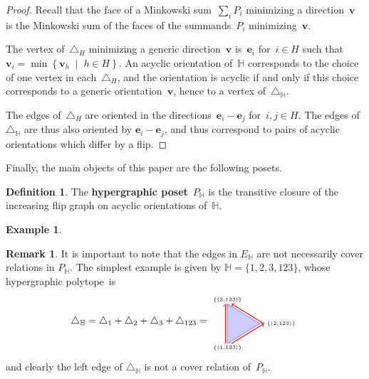 \documentclass[reqno]{amsart}
\theoremstyle{definition}
\newtheorem{definition}[theorem]{Definition}
\newtheorem{example}[theorem]{Example}
\newtheorem{remark}[theorem]{Remark}
\renewcommand{\b}[1]{\boldsymbol{#1}} %
\newcommand{\set}[2]{\left\{ #1 \;\middle|\; #2 \right\}} %
\newcommand{\simplex}{\triangle} %
\newcommand{\defn}[1]{\textbf{\textsf{\color{PineGreen} #1}}} %
\newcommand{\vincent}[1]{\todo[size=\tiny,color=blue!30]{ #1 \\ \hfill --- V.}\,}
\newcommand{\HH}{\mathbb H}  %
\begin{document}
\begin{proof}
Recall that the face of a Minkowski sum~$\sum_i P_i$ minimizing a direction~$\b{v}$ is the Minkowski sum of the faces of the summands~$P_i$ minimizing~$\b{v}$.

The vertex of~$\simplex_H$ minimizing a generic direction~$\b{v}$ is~$\b{e}_i$ for~$i \in H$ such that~$\b{v}_i = \min\set{\b{v}_h}{h \in H}$.
An acyclic orientation of~$\HH$ corresponds to the choice of one vertex in each~$\simplex_H$, and the orientation is acyclic if and only if this choice corresponds to a generic orientation~$\b{v}$, hence to a vertex of~$\simplex_\HH$.

The edges of~$\simplex_H$ are oriented in the directions~$\b{e}_i-\b{e}_j$ for~$i,j \in H$.
The edges of~$\simplex_\HH$ are thus also oriented by $\b{e}_i-\b{e}_j$, and thus correspond to pairs of acyclic orientations which differ by a flip.
\end{proof}

Finally, the main objects of this paper are the following posets.

\begin{definition}
The \defn{hypergraphic poset}~$P_\HH$ is the transitive closure of the increasing flip graph on acyclic orientations of~$\HH$.
\end{definition}

\begin{example}
\vincent{todo}
\end{example}

\begin{remark}
\label{rem:edgeNotCover}
It is important to note that the edges in $E_\HH$ are not necessarily cover relations in $P_\HH$.
The simplest example is given by
$\HH=\{ 1, 2, 3, 123 \}$, 
whose hypergraphic polytope~is
\[
	\simplex_\HH=\simplex_1+\simplex_2+\simplex_3+\simplex_{123}=
	\begin{tikzpicture}[scale=.7,baseline=.0cm]
		\node (a) at (0,-1.2) {$\scriptscriptstyle \{(1, 123)\}$};
		\node (b) at (2.7,0) {$\scriptscriptstyle \{(2, 123)\}$};
		\node (c) at (0,1.2) {$\scriptscriptstyle \{(3, 123)\}$};
		\draw [color=blue!40,thick,fill=blue!20] (0,-1)--(0,1)--(1.632,0)--(0,-1) ; 
		\draw [color=red,thick,->] (-.1,-1)--(-.1,1); 
		\draw [color=red,thick,->] (1.832,0)--(.2,1); 
		\draw [color=red,thick,->] (.2,-1)--(1.832,0); 
	\end{tikzpicture}
\]
and clearly the left edge of $\simplex_\HH$ is not a cover relation of~$P_\HH$.
\end{remark}
\end{document}
